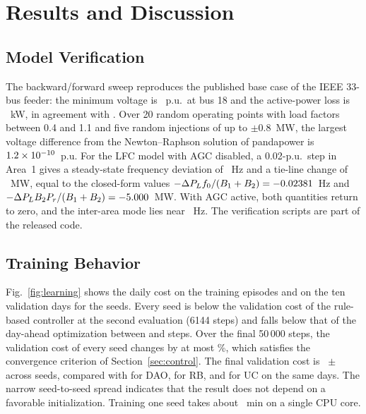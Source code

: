 \section{Results and Discussion}
\label{sec:results}

\subsection{Model Verification}
\label{sec:verif}

The backward/forward sweep reproduces the published base case of the
IEEE 33-bus feeder: the minimum voltage is \ValVmin~p.u.\ at bus 18 and
the active-power loss is \ValLoss~kW, in agreement with
\cite{BaranWu1989}. Over 20 random operating points with load factors
between 0.4 and 1.1 and five random injections of up to $\pm0.8$~MW,
the largest voltage difference from the Newton--Raphson solution of
pandapower \cite{Thurner2018} is $1.2\times10^{-10}$~p.u. For the LFC model with
AGC disabled, a 0.02-p.u.\ step in Area~1 gives a steady-state frequency
deviation of \ValDfSim~Hz and a tie-line change of \ValTieSim~MW, equal
to the closed-form values $-\Delta P_L f_0/(B_1+B_2)=-0.02381$~Hz and
$-\Delta P_LB_2P_r/(B_1+B_2)=-5.000$~MW. With AGC active, both
quantities return to zero, and the inter-area mode lies near
\ValMode~Hz. The verification scripts are part of the released code.

\subsection{Training Behavior}
\label{sec:training}

Fig.~\ref{fig:learning} shows the daily cost on the training episodes
and on the ten validation days for the \NSeed{} seeds. Every seed is below
the validation cost of the rule-based controller at the second
evaluation (6144 steps) and falls below that of the day-ahead
optimization between \CrossDAOLo{} and \CrossDAOHi{} steps. Over the
final 50\,000 steps, the validation cost of every seed changes by at
most \ConvChangePct\%, which satisfies the convergence criterion of
Section~\ref{sec:control}. The final validation cost is
\FinalValCost~$\pm$~\FinalValCostSd{} across seeds, compared with
\ValDAO{} for DAO, \ValRB{} for RB, and \ValUC{} for UC on the same
days. The narrow seed-to-seed spread indicates that the result does not
depend on a favorable initialization. Training one seed takes about
\TrainMin~min on a single CPU core.


